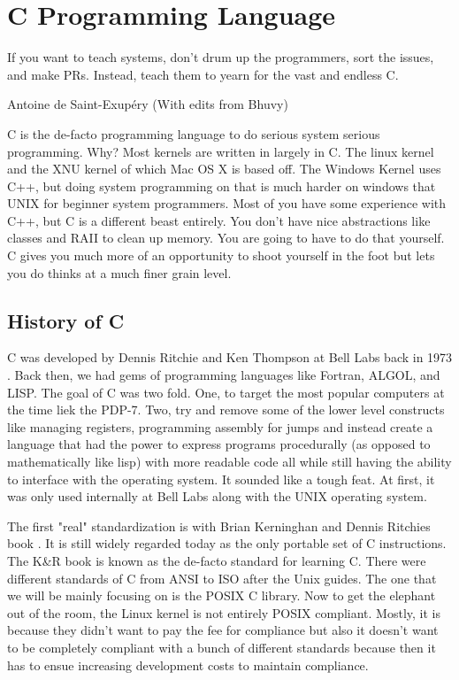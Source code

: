 \chapter{C Programming Language}

\epigraph{If you want to teach systems, don't drum up the programmers, sort the issues, and make PRs. Instead, teach them to yearn for the vast and endless C.}{Antoine de Saint-Exup\'{e}ry (With edits from Bhuvy)}

\gls{C} is the de-facto programming language to do serious system serious programming. Why? Most kernels are written in largely in C. The \gls{linux kernel} \cite{Love} and the XNU kernel \citet{xnukernel} of which Mac OS X is based off. The Windows Kernel uses C++, but doing system programming on that is much harder on windows that UNIX for beginner system programmers. Most of you have some experience with C++, but C is a different beast entirely. You don't have nice abstractions like classes and RAII to clean up memory. You are going to have to do that yourself. C gives you much more of an opportunity to shoot yourself in the foot but lets you do thinks at a much finer grain level.

\section{History of C}

C was developed by Dennis Ritchie and Ken Thompson at Bell Labs back in 1973 \cite{Ritchie:1993:DCL:155360.155580}. Back then, we had gems of programming languages like Fortran, ALGOL, and LISP. The goal of C was two fold. One, to target the most popular computers at the time liek the PDP-7. Two, try and remove some of the lower level constructs like managing registers, programming assembly for jumps and instead create a language that had the power to express programs procedurally (as opposed to mathematically like lisp) with more readable code all while still having the ability to interface with the operating system. It sounded like a tough feat. At first, it was only used internally at Bell Labs along with the UNIX operating system.

The first "real" standardization is with Brian Kerninghan and Dennis Ritchies book \cite{kernighan1988c}. It is still widely regarded today as the only \gls{portable} set of C instructions. The K\&R book is known as the de-facto standard for learning C.  There were different standards of C from ANSI to ISO after the Unix guides. The one that we will be mainly focusing on is the \gls{POSIX} C library. Now to get the elephant out of the room, the Linux kernel is not entirely POSIX compliant. Mostly, it is because they didn't want to pay the fee for compliance but also it doesn't want to be completely compliant with a bunch of different standards because then it has to ensue increasing development costs to maintain compliance.

